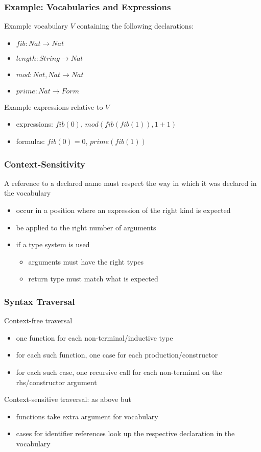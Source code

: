 \begin{frame}\frametitle{Example: Vocabularies and Expressions}
Example vocabulary $V$ containing the following declarations:
\begin{itemize}
\item $fib:Nat \to Nat$
\item $length: String \to Nat$
\item $mod: Nat,Nat \to Nat$
\item $prime: Nat \to Form$
\end{itemize}

Example expressions relative to $V$
\begin{itemize}
\item expressions: $fib(0)$, $mod(fib(fib(1)),1+1)$
\item formulas: $fib(0)=0$, $prime(fib(1))$
\end{itemize}
\end{frame}

\begin{frame}\frametitle{Context-Sensitivity}
A reference to a declared name must respect the way in which it was declared in the vocabulary
\begin{itemize}
 \item occur in a position where an expression of the right kind is expected
 \item be applied to the right number of arguments
 \item if a type system is used
  \begin{itemize}
  \item arguments must have the right types
  \item return type must match what is expected
  \end{itemize}
\end{itemize}
\end{frame}

\begin{frame}\frametitle{Syntax Traversal}
Context-free traversal
\begin{itemize}
\item one function for each non-terminal/inductive type 
\item for each such function, one case for each production/constructor
\item for each such case, one recursive call for each non-terminal on the rhs/constructor argument
\end{itemize}

Context-sensitive traversal: as above but
\begin{itemize}
\item functions take extra argument for vocabulary
\item cases for identifier references look up the respective declaration in the vocabulary
\end{itemize}
\end{frame}

